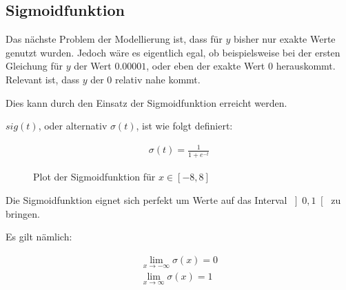 \subsection{Sigmoidfunktion}
\begin{flushleft}   
Das nächste Problem der Modellierung ist, dass für $y$ bisher nur exakte Werte genutzt wurden.
Jedoch wäre es eigentlich egal, ob beispielsweise bei der ersten Gleichung für $y$ der Wert $0.00001$, oder eben der exakte Wert $0$ herauskommt.
Relevant ist, dass $y$ der $0$ relativ nahe kommt.

Dies kann durch den Einsatz der Sigmoidfunktion erreicht werden.

$sig(t)$, oder alternativ $\sigma(t)$, ist wie folgt definiert:
\end{flushleft}
\begin{align}
    \sigma(t)=\frac{1}{1+e^{-t}}
\end{align}

\begin{figure}[ht]
    \centering
    \caption{Plot der Sigmoidfunktion für $x\in\left[-8,8\right]$}
    \label{fig:sigplot}
\end{figure}

\begin{flushleft}   
Die Sigmoidfunktion eignet sich perfekt um Werte auf das Interval $\left]0,1\right[$ zu bringen.

Es gilt nämlich:
\end{flushleft}
\begin{align}
    \lim_{x\to-\infty} \sigma(x) = 0 \\
    \lim_{x\to\infty} \sigma(x) = 1
\end{align}

